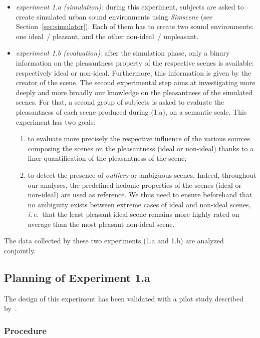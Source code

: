 \documentclass[12pt]{elsarticle}
\newcommand{\ie}{\emph{i.\,e.}}
\begin{document}
\begin{itemize}
\item \emph{experiment 1.a (simulation)}: during this experiment, subjects are asked to create simulated urban sound environments using \emph{Simscene} (see Section~\ref{sec:simulator}). Each of them has to create two sound environments: one ideal~/ pleasant, and the other non-ideal~/ unpleasant.
\item \emph{experiment 1.b (evaluation)}: after the simulation phase, only a binary information on the pleasantness property of the respective scenes is available: respectively ideal or non-ideal. Furthermore, this information is given by the creator of the scene. The second experimental step aims at investigating more deeply and more broadly our knowledge on the pleasantness of the simulated scenes. For that, a second group of subjects is asked to evaluate the pleasantness of each scene produced during (1.a), on a semantic scale. This experiment has two goals:
\begin{enumerate}
\item to evaluate more precisely the respective influence of the various sources composing the scenes on the pleasantness  (ideal or non-ideal) thanks to a finer quantification of the pleasantness of the scene;
\item to detect the presence of \emph{outliers} or ambiguous scenes. Indeed, throughout our analyses, the predefined hedonic properties of the scenes (ideal or non-ideal) are used as reference. We thus need to ensure beforehand that no ambiguity exists between extreme cases of ideal and non-ideal scenes, \ie~that the least pleasant ideal scene remains more highly rated on average than the most pleasant non-ideal scene.
\end{enumerate}
\end{itemize}


The data collected by these two experiments (1.a and 1.b) are analyzed conjointly.

\subsection{Planning of Experiment 1.a}
\label{sec:xp1a_plan}

The design of this experiment has been validated with a pilot study described by~\cite{lafay2014new}.

\subsubsection*{Procedure}
\end{document}
